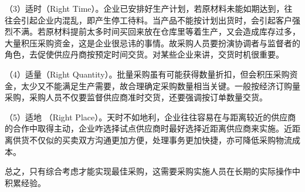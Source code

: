     （3）适时（Right Time）。企业已安排好生产计划，若原材料未能如期达到，往往会引起企业内混乱，即产生停工待料。当产品不能按计划出货时，会引起客户强烈不满。若原材料提前太多时间买回来放在仓库里等着生产，又会造成库存过多，大量积压采购资金，这是企业很忌讳的事情。故采购人员要扮演协调者与监督者的角色，去促使供应丹商按预定时间交货。对某些企业来讲，交货时机很重要。

    （4）适量（Right Quantity）。批量采购虽有可能获得数量折扣，但会积压采购资金，太少又不能满足生产需要，故合理确定采购数量相当关键。一般按经济订购量采购，采购人员不仅要监督供应商准时交货，还要强调按订单数量交货。

    （5）适地 （Right Place）。天时不如地利，企业往往容易在与距离较近的供应商的合作中取得主动，企业咋选择试点供应商时最好选择近距离供应商来实施。近距离供货不仅似的买卖双方沟通更加方便，处理事务更加快捷，亦可降低采购物流成本。

    总之，只有综合考虑才能实现最佳采购，这需要采购实施人员在长期的实际操作中积累经验。
